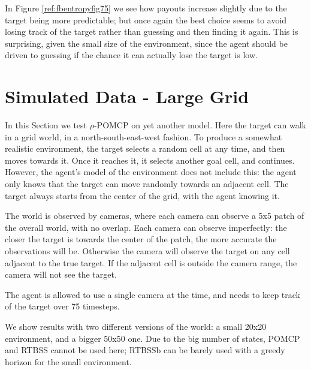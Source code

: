 In Figure \ref{ref:fbentropyfig75} we see how payouts increase slightly due to the target being more
predictable; but once again the best choice seems to avoid losing track of the target rather than
guessing and then finding it again. This is surprising, given the small size of the environment,
since the agent should be driven to guessing if the chance it can actually lose the target is low.

%

\section{Simulated Data - Large Grid}

In this Section we test $\rho$-POMCP on yet another model. Here the target can walk in a grid world,
in a north-south-east-west fashion. To produce a somewhat realistic environment, the target selects
a random cell at any time, and then moves towards it. Once it reaches it, it selects another goal
cell, and continues. However, the agent's model of the environment does not include this: the agent
only knows that the target can move randomly towards an adjacent cell. The target always starts from
the center of the grid, with the agent knowing it.

The world is observed by cameras, where each camera can observe a 5x5 patch of the overall world,
with no overlap. Each camera can observe imperfectly: the closer the target is towards the center
of the patch, the more accurate the observations will be. Otherwise the camera will observe the
target on any cell adjacent to the true target. If the adjacent cell is outside the camera range,
the camera will not see the target.

The agent is allowed to use a single camera at the time, and needs to keep track of the target over
75 timesteps.

We show results with two different versions of the world: a small 20x20 environment, and a bigger
50x50 one. Due to the big number of states, POMCP and RTBSS cannot be used here; RTBSSb can be
barely used with a greedy horizon for the small environment.

